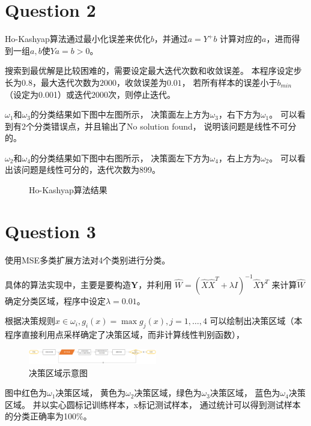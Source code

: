 \documentclass{article}
\newcommand{\question}[1]{\section*{Question #1}}
\begin{document}
\question{2}
Ho-Kashyap算法通过最小化误差来优化$b$，并通过$a = Y^+ b$
计算对应的$a$，进而得到一组$a, b$使$Ya = b > 0$。 

搜索到最优解是比较困难的，需要设定最大迭代次数和收敛误差。
本程序设定步长为0.8，最大迭代次数为$2000$，收敛误差为$0.01$，
若所有样本的误差小于$b_{min}$（设定为0.001）或迭代$2000$次，则停止迭代。


$\omega_1$和$\omega_3$的分类结果如下图中左图所示，
决策面左上方为$\omega_3$，右下方为$\omega_1$。
可以看到有2个分类错误点，并且输出了No solution found，
说明该问题是线性不可分的。

$\omega_2$和$\omega_4$的分类结果如下图中右图所示，
决策面左下方为$\omega_4$，右上方为$\omega_2$。
可以看出该问题是线性可分的，迭代次数为899。
\begin{figure}[ht]
	\centering
	\centering
	\caption{Ho-Kashyap算法结果}
	\label{figl}
\end{figure}

\question{3}
使用MSE多类扩展方法对4个类别进行分类。

具体的算法实现中，主要是要构造$\pmb{Y}$，并利用
${\hat W = {(\hat X{\hat X^T} + \lambda I)^{ - 1}}\hat X{Y^T}}$
来计算$\hat W$确定分类区域，程序中设定$\lambda = 0.01$。

根据决策规则$x \in \omega_i, g_i(x) = \max  g_j(x), j = 1, \dots, 4$
可以绘制出决策区域（本程序直接利用点采样确定了决策区域，而非计算线性判别函数），

\begin{figure}[ht]
	\centering
	\includegraphics[width=0.5\textwidth]{Figure_2.png}
	\caption{决策区域示意图}
	\label{figl}
\end{figure}

图中红色为$\omega_1$决策区域，
黄色为$\omega_2$决策区域，绿色为$\omega_3$决策区域，
蓝色为$\omega_4$决策区域。
并以实心圆标记训练样本，x标记测试样本，
通过统计可以得到测试样本的分类正确率为100\%。
\end{document}
